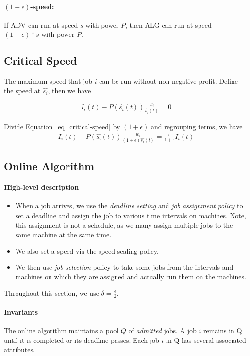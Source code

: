 \documentclass[10 pt,final]{article}
\begin{document}
\paragraph{$(1+\epsilon)$-speed: } If ADV can run at speed $s$ with power $P$, then ALG can run at speed $(1+\epsilon)*s$ with power $P$.

\subsection{Critical Speed} 

The maximum speed that job $i$ can be run without non-negative profit. Define the speed at $\hat{s_i}$, then we have

\begin{align}
I_i(t) - P(\hat{s_i}(t)) \frac{w_i}{\hat{s_i}(t)} = 0
\label{eq_critical-speed}
\end{align}

Divide Equation~\ref{eq_critical-speed} by $(1+\epsilon)$ and regrouping terms, we have
\begin{align}
I_i(t) - P(\hat{s_i}(t)) \frac{w_i}{(1+\epsilon)\hat{s_i}(t)} = \frac{\epsilon}{1+\epsilon} I_i(t)
\end{align}

\subsection{Online Algorithm}

\paragraph{High-level description}
\begin{itemize}
\item When a job arrives, we use the \emph{deadline setting} and \emph{job assignment policy} to set a deadline and assign the job to various time intervals on machines. Note, this assignment is not a schedule, as we many assign multiple jobs to the same machine at the same time.
\item We also set a speed via the speed scaling policy.
\item We then use \emph{job selection} policy to take some jobs from the intervals and machines on which they are assigned and actually run them on the machines.
\end{itemize}

Throughout this section, we use $\delta = \frac{\epsilon}{2}$.

\paragraph{Invariants} The online algorithm maintains a pool $Q$ of \emph{admitted} jobs. A job $i$ remains in Q until it is completed or its deadline passes. Each job $i$ in Q has several associated attributes.
\end{document}
